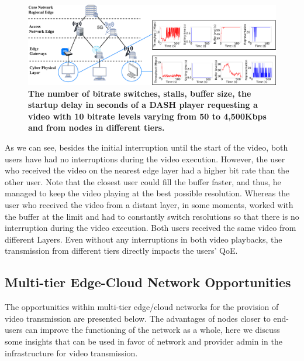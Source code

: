 \begin{figure}
    \centering
    \includegraphics[width=\linewidth]{images/qoe-multi-level-3.pdf}
    \caption{\textbf{The number of bitrate switches, stalls, buffer size, the startup delay in seconds of a DASH player requesting a video with 10 bitrate levels varying from 50 to 4,500Kbps and from nodes in different tiers.}}
    \label{fig:impact-two-layers}
\end{figure}


As we can see, besides the initial interruption until the start of the video, both users have had no interruptions during the video execution. However, the user who received the video on the nearest edge layer had a higher bit rate than the other user. 
Note that the closest user could fill the buffer faster, and thus, he managed to keep the video playing at the best possible resolution.
Whereas the user who received the video from a distant layer, in some moments, worked with the buffer at the limit and had to constantly switch resolutions so that there is no interruption during the video execution. 
Both users received the same video from different Layers. Even without any interruptions in both video playbacks, the transmission from different tiers directly impacts the users' QoE.


\subsection{Multi-tier Edge-Cloud Network Opportunities}

The opportunities within multi-tier edge/cloud networks for the provision of video transmission are presented below. The advantages of nodes closer to end-users can improve the functioning of the network as a whole, here we discuss some insights that can be used in favor of network and provider admin in the infrastructure for video transmission.

